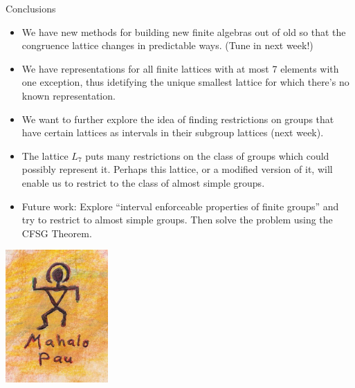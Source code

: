 \begin{frame}[fragile,label=FinalConclusions]{Conclusions}
  \begin{itemize}
  \item<1-5> We have new methods for building new finite algebras out of
    old  so that the congruence lattice changes in predictable ways.
(Tune in next week!)
\vskip2mm
  \item<2-5> We have representations for all
    finite lattices with at most 7 elements with one exception, thus
    idetifying the unique smallest lattice for which there's no known
    representation. 
\vskip2mm
  \item<3-5> We want to further explore the idea of finding restrictions on groups
    that have certain lattices as intervals in their subgroup lattices (next week).
\vskip2mm
\item<4-5> The lattice $L_7$ puts many restrictions on the class of
  groups which could possibly represent it.  Perhaps this lattice, or
  a modified version of it, will enable us to restrict to the class of almost simple
  groups.
\vskip2mm
\item<5-5> Future work: Explore ``interval enforceable properties of finite
  groups'' and try to restrict to almost simple groups.  Then solve the problem using the CFSG Theorem.
  \end{itemize}
\end{frame}
\begin{frame}[fragile,label=FinalConclusions]{}
  \begin{center}
  \includegraphics[height=2in]{inputs/MahaloPau}
  \end{center}
\end{frame}








